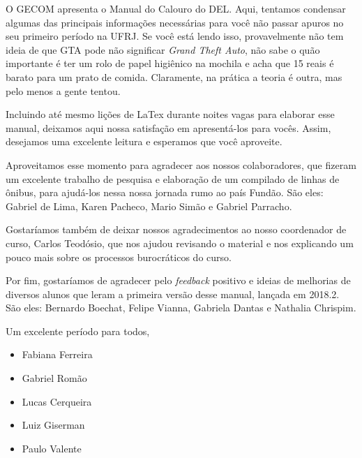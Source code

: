 	O GECOM apresenta o Manual do Calouro do DEL. Aqui, tentamos condensar algumas das principais informações necessárias para você não passar apuros no seu primeiro período na UFRJ. Se você está lendo isso, provavelmente não tem ideia de que GTA pode não significar \textit{Grand Theft Auto}, não sabe o quão importante é ter um rolo de papel higiênico na mochila e acha que 15 reais é barato para um prato de comida. 
    Claramente, na prática a teoria é outra, mas pelo menos a gente tentou.
    
   	Incluindo até mesmo lições de LaTex durante noites vagas para elaborar esse manual, deixamos aqui nossa satisfação em apresentá-los para vocês. Assim, desejamos uma excelente leitura e esperamos que você aproveite. 
    
    Aproveitamos esse momento para agradecer aos nossos colaboradores, que fizeram um excelente trabalho de pesquisa e elaboração de um compilado de linhas de ônibus, para ajudá-los nessa nossa jornada rumo ao país Fundão. São eles: Gabriel de Lima, Karen Pacheco, Mario Simão e Gabriel Parracho.
    
    Gostaríamos também de deixar nossos agradecimentos ao nosso coordenador de curso, Carlos Teodósio, que nos ajudou revisando o material e nos explicando um pouco mais sobre os processos burocráticos do curso.
    
    Por fim, gostaríamos de agradecer pelo \textit{feedback} positivo e ideias de melhorias de diversos alunos que leram a primeira versão desse manual, lançada em 2018.2. São eles: Bernardo Boechat, Felipe Vianna, Gabriela Dantas e Nathalia Chrispim.
    
    Um excelente período para todos,
    
    \begin{itemize}
    	\item [] Fabiana Ferreira    
    	\item [] Gabriel Romão
		\item [] Lucas Cerqueira
		\item [] Luiz Giserman
		\item [] Paulo Valente
    \end{itemize}
    